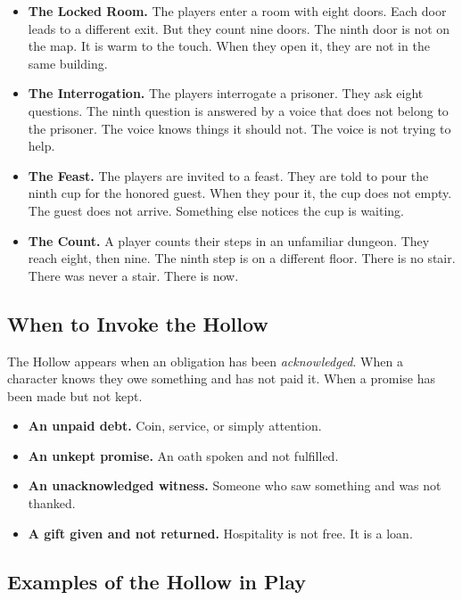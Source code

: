 \documentclass[11pt]{book}
\begin{document}
\begin{itemize}
  \item \textbf{The Locked Room.} The players enter a room with eight doors. Each door leads to a different exit. But they count nine doors. The ninth door is not on the map. It is warm to the touch. When they open it, they are not in the same building.
  \item \textbf{The Interrogation.} The players interrogate a prisoner. They ask eight questions. The ninth question is answered by a voice that does not belong to the prisoner. The voice knows things it should not. The voice is not trying to help.
  \item \textbf{The Feast.} The players are invited to a feast. They are told to pour the ninth cup for the honored guest. When they pour it, the cup does not empty. The guest does not arrive. Something else notices the cup is waiting.
  \item \textbf{The Count.} A player counts their steps in an unfamiliar dungeon. They reach eight, then nine. The ninth step is on a different floor. There is no stair. There was never a stair. There is now.
\end{itemize}

\subsection{When to Invoke the Hollow}

The Hollow appears when an obligation has been \textit{acknowledged}. When a character knows they owe something and has not paid it. When a promise has been made but not kept.

\begin{tcolorbox}[colback=shadowpurple!5!white, colframe=shadowpurple!75!black, title=Triggers for the Hollow,breakable]
\begin{itemize}
  \item \textbf{An unpaid debt.} Coin, service, or simply attention.
  \item \textbf{An unkept promise.} An oath spoken and not fulfilled.
  \item \textbf{An unacknowledged witness.} Someone who saw something and was not thanked.
  \item \textbf{A gift given and not returned.} Hospitality is not free. It is a loan.
\end{itemize}
\end{tcolorbox}

\subsection{Examples of the Hollow in Play}
\end{document}

